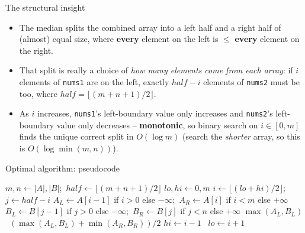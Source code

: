 \documentclass[11pt,aspectratio=169]{beamer}
\begin{document}
\begin{frame}{The structural insight}
  \begin{itemize}
    \item The median splits the combined array into a left half and a right half of
    (almost) equal size, where \textbf{every} element on the left is $\le$ \textbf{every}
    element on the right.
    \item That split is really a choice of \emph{how many elements come from each
    array}: if $i$ elements of \texttt{nums1} are on the left, exactly
    $half - i$ elements of \texttt{nums2} must be too, where
    $half = \lfloor (m+n+1)/2 \rfloor$.
    \item As $i$ increases, \texttt{nums1}'s left-boundary value only increases and
    \texttt{nums2}'s left-boundary value only decreases -- \textbf{monotonic}, so binary
    search on $i \in [0, m]$ finds the unique correct split in $O(\log m)$ (search the
    \emph{shorter} array, so this is $O(\log \min(m,n))$).
  \end{itemize}
\end{frame}

\begin{frame}{Optimal algorithm: pseudocode}
  \footnotesize
  \begin{algorithmic}[1]
     
      \State $m, n \gets |A|, |B|$;\ $half \gets \lfloor (m+n+1)/2 \rfloor$
      \State $lo, hi \gets 0, m$
        \State $i \gets \lfloor (lo+hi)/2 \rfloor$;\ $j \gets half - i$
        \State $A_L \gets A[i-1]$ if $i{>}0$ else $-\infty$;\ $A_R \gets A[i]$ if $i{<}m$
        else $+\infty$
        \State $B_L \gets B[j-1]$ if $j{>}0$ else $-\infty$;\ $B_R \gets B[j]$ if $j{<}n$
        else $+\infty$
           \Return $\max(A_L, B_L)$
          \Else\ \Return $(\max(A_L,B_L) + \min(A_R,B_R))/2$ \EndIf
         $hi \gets i-1$
        \Else\ $lo \gets i+1$ \EndIf
      \EndWhile
    \EndFunction
  \end{algorithmic}
\end{frame}
\end{document}

